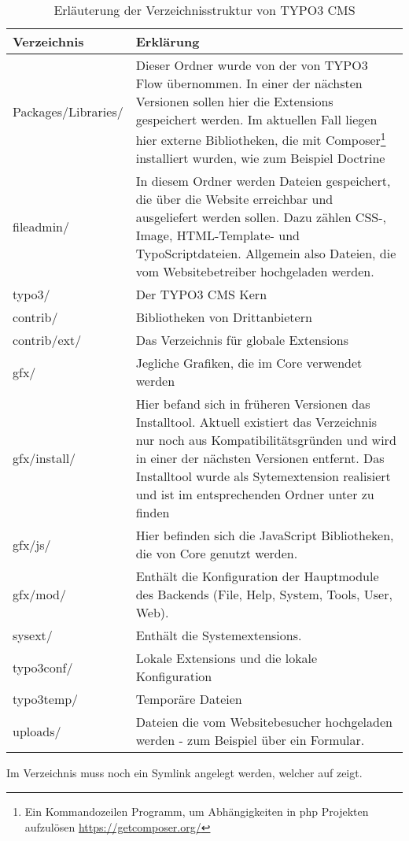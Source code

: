 \begin{table}
	\begin{tabularx}{\textwidth}{|X|X|}
		\hline
		Verzeichnis & Erklärung\\ \hline
		Packages/Libraries/ & Dieser Ordner wurde von der von TYPO3 Flow übernommen. In einer der nächsten Versionen sollen hier die Extensions gespeichert werden. Im aktuellen Fall liegen hier externe Bibliotheken, die mit Composer\footnote{Ein Kommandozeilen Programm, um Abhängigkeiten in \gls{php} Projekten aufzulösen \url{https://getcomposer.org/}} installiert wurden, wie zum Beispiel Doctrine\\ \hline
		fileadmin/ & In diesem Ordner werden Dateien gespeichert, die über die Website erreichbar und ausgeliefert werden sollen. Dazu zählen CSS-, Image, HTML-Template- und TypoScriptdateien. Allgemein also Dateien, die vom Websitebetreiber hochgeladen werden.\\ \hline
		typo3/ & Der TYPO3 CMS Kern\\ \hline
		contrib/ & Bibliotheken von Drittanbietern\\ \hline
		contrib/ext/ & Das Verzeichnis für globale Extensions \\ \hline
		gfx/ & Jegliche Grafiken, die im Core verwendet werden \\ \hline
		gfx/install/ & Hier befand sich in früheren Versionen das Installtool. Aktuell existiert das Verzeichnis nur noch aus Kompatibilitätsgründen und wird in einer der nächsten Versionen entfernt. Das Installtool wurde als Sytemextension realisiert und ist im entsprechenden Ordner unter \pdf{sysext/install/} zu finden\\ \hline
		gfx/js/ & Hier befinden sich die JavaScript Bibliotheken, die von Core genutzt werden.\\ \hline
		gfx/mod/ & Enthält die Konfiguration der Hauptmodule des Backends (File, Help, System, Tools, User, Web).\\ \hline
		sysext/ & Enthält die Systemextensions.\\ \hline
		typo3conf/ & Lokale Extensions und die lokale Konfiguration\\ \hline
		typo3temp/ & Temporäre Dateien\\ \hline
		uploads/ & Dateien die vom Websitebesucher hochgeladen werden - zum Beispiel über ein Formular.\\ \hline
	\end{tabularx}
	\caption{Erläuterung der Verzeichnisstruktur von TYPO3 CMS}
	\label{tab:typo3FolderStructure}
\end{table}
Im Verzeichnis  muss noch ein Symlink  angelegt werden, welcher auf  zeigt.

